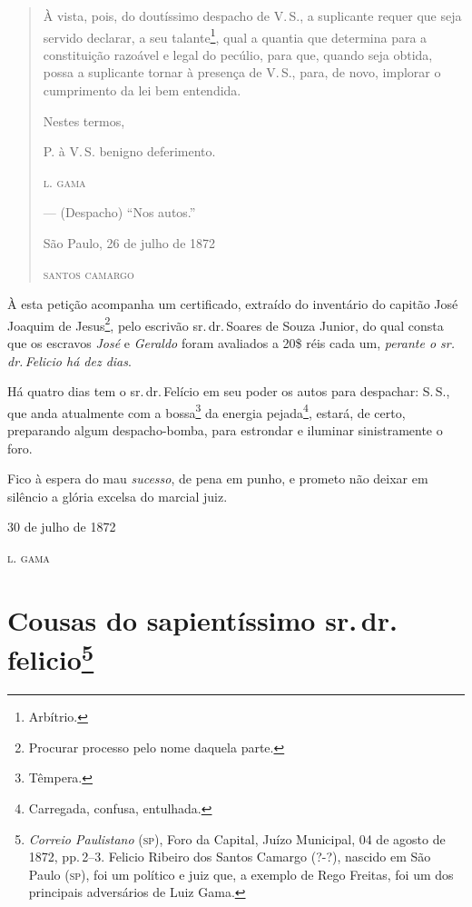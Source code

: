 \begin{quote}
À vista, pois, do doutíssimo despacho de V.\,S., a suplicante requer que
seja servido declarar, a seu talante\footnote{ Arbítrio.}, qual a
quantia que determina para a constituição razoável e legal do pecúlio,
para que, quando seja obtida, possa a suplicante tornar à presença de V.\,S., para, de novo, implorar o cumprimento da lei bem entendida.

\begin{flushright}
Nestes termos,

P. à V.\,S. benigno deferimento.

\textsc{l. gama}
\end{flushright}

--- (Despacho) ``Nos autos.''

\begin{flushright}
São Paulo, 26 de julho de 1872

\textsc{santos camargo}
\end{flushright}
\end{quote}

À esta petição acompanha um certificado, extraído do inventário do
capitão José Joaquim de Jesus\footnote{ Procurar processo pelo nome
  daquela parte.}, pelo escrivão sr.\,dr.\,Soares de Souza Junior, do qual
consta que os escravos \emph{José} e \emph{Geraldo} foram avaliados a
20\$ réis cada um, \emph{perante o sr.\,dr.\,Felicio há dez dias}.

\asterisc

Há quatro dias tem o sr.\,dr.\,Felício em seu poder os autos para
despachar: S.\,S., que anda atualmente com a bossa\footnote{ Têmpera.}
da energia pejada\footnote{ Carregada, confusa, entulhada.}, estará, de
certo, preparando algum despacho-bomba, para estrondar e iluminar
sinistramente o foro.

Fico à espera do mau \emph{sucesso}, de pena em punho, e prometo não
deixar em silêncio a glória excelsa do marcial juiz.

\begin{flushright}
30 de julho de 1872

\textsc{l. gama}
\end{flushright}

\chapter{Cousas do sapientíssimo sr.\,dr.\,felicio\footnote{\emph{Correio Paulistano} (\textsc{sp}), Foro da Capital, Juízo
  Municipal, 04 de agosto de 1872, pp.\,2--3. Felicio Ribeiro dos Santos Camargo
  (?-?), nascido em São Paulo (\textsc{sp}), foi um político e juiz que, a
  exemplo de Rego Freitas, foi um dos principais adversários de Luiz
  Gama.}} %

